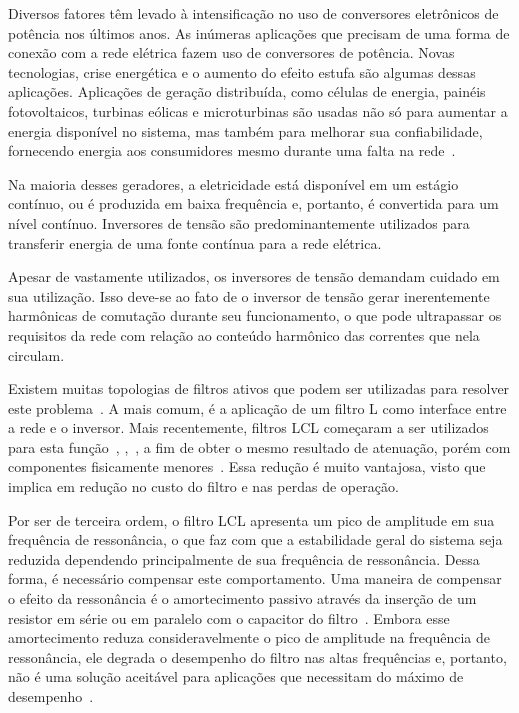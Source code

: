 
\label{introducao}

	Diversos fatores têm levado à intensificação no uso de conversores eletrônicos
	de potência nos últimos anos. As inúmeras aplicações que precisam de uma forma
	de conexão com a rede elétrica fazem uso de conversores de potência.
	Novas tecnologias, crise energética e o aumento do efeito estufa são algumas
	dessas aplicações. Aplicações de geração distribuída, como células de energia,
	painéis fotovoltaicos, turbinas eólicas e microturbinas são usadas não só
	para aumentar a energia disponível no sistema, mas também para melhorar sua
	confiabilidade, fornecendo energia aos consumidores mesmo durante uma falta
	na rede~\cite{ref:KARSHENAS}.

	Na maioria desses geradores, a eletricidade está disponível em um estágio
	contínuo, ou é produzida em baixa frequência e, portanto, é convertida
	para um nível contínuo. Inversores de tensão são predominantemente utilizados
	para transferir energia de uma fonte contínua para a rede elétrica.

	Apesar de vastamente utilizados, os inversores de tensão demandam cuidado
	em sua utilização. Isso deve-se ao fato de o inversor de tensão gerar
	inerentemente harmônicas de comutação durante seu funcionamento, o que pode
	ultrapassar os requisitos da rede com relação ao conteúdo harmônico
	das correntes que nela circulam.

	Existem muitas topologias de filtros ativos que podem ser utilizadas para
	resolver este problema~\cite{ref:RIBEIRO}. A mais comum, é a aplicação de
	um filtro L como interface entre a rede e o inversor. Mais recentemente,
	filtros LCL começaram a ser utilizados para esta função~\cite{ref:LINDGREN},
	\cite{ref:TEODORESCU},~\cite{ref:XU}, a fim de obter o
	mesmo resultado de atenuação, porém com componentes fisicamente
	menores~\cite{ref:HOLMES}. Essa redução é muito vantajosa, visto que implica
	em redução no custo do filtro e	nas perdas de operação.

	Por ser de terceira ordem, o filtro LCL apresenta um pico de amplitude em
	sua frequência de ressonância, o que faz com que a estabilidade geral do
	sistema seja reduzida dependendo principalmente de sua frequência de
	ressonância. Dessa forma, é necessário compensar este comportamento.
	Uma maneira de compensar o efeito da ressonância é o amortecimento passivo
	através da inserção	de um resistor em série ou em paralelo com o capacitor
	do filtro~\cite{ref:AHMED}. Embora	esse amortecimento reduza consideravelmente
	o pico de amplitude na frequência de ressonância, ele degrada o desempenho do
	filtro nas altas frequências e, portanto, não é uma solução aceitável para
	aplicações que necessitam do máximo de desempenho~\cite{ref:SHEN}.

